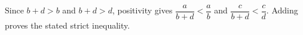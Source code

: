 Since $b+d>b$ and $b+d>d$, positivity gives $\dfrac{a}{b+d}<\dfrac{a}{b}$ and $\dfrac{c}{b+d}<\dfrac{c}{d}$. Adding proves the stated strict inequality.
